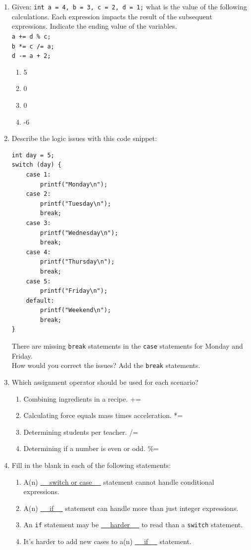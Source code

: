 \documentclass[letter,11pt]{article}
\begin{document}
\begin{enumerate}
    \item Given: \texttt{int a = 4, b = 3, c = 2, d = 1;} what is the value of the following calculations. Each expression impacts the result of the subsequent expressions. Indicate the ending value of the variables. \\
    \texttt{a += d \% c;} \\
    \texttt{b *= c /= a;} \\
    \texttt{d -= a + 2;}
    \begin{enumerate}
        \item {\color{red}5}
        \item {\color{red}0}
        \item {\color{red}0}
        \item {\color{red}-6}
    \end{enumerate}
    
    \item Describe the logic issues with this code snippet:
    \begin{verbatim}
int day = 5;
switch (day) {
    case 1:
        printf("Monday\n");
    case 2:
        printf("Tuesday\n");
        break;
    case 3:
        printf("Wednesday\n");
        break;
    case 4:
        printf("Thursday\n");
        break;
    case 5:
        printf("Friday\n");
    default:
        printf("Weekend\n");
        break;
}
    \end{verbatim}
    {\color{red}There are missing \texttt{break} statements in the \texttt{case} statements for Monday and Friday.} \\
    How would you correct the issues? {\color{red}Add the \texttt{break} statements.}
    
    \item Which assignment operator should be used for each scenario?
    \begin{enumerate}
        \item Combining ingredients in a recipe. {\color{red}+=}
        \item Calculating force equals mass times acceleration. {\color{red}*=}
        \item Determining students per teacher. {\color{red}/=}
        \item Determining if a number is even or odd. {\color{red}\%=}
    \end{enumerate}
    
    \item Fill in the blank in each of the following statements:
    \begin{enumerate}
        \item A(n) \underline{~~ switch or case ~~} statement cannot handle conditional expressions.
        \item A(n) \underline{~~ if ~~} statement can handle more than just integer expressions.
        \item An \texttt{if} statement may be \underline{~~ harder ~~} to read than a \texttt{switch} statement.
        \item It's harder to add new cases to a(n) \underline{~~ if ~~} statement.
    \end{enumerate}
    

\end{enumerate}
\end{document}
